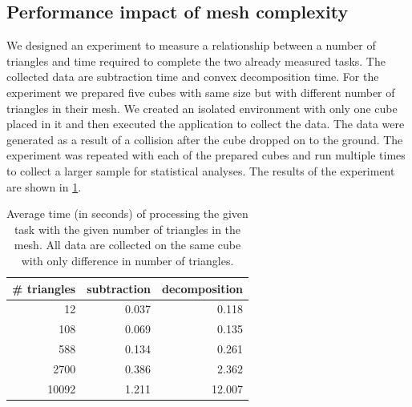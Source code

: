 \subsection{Performance impact of mesh complexity}
We designed an experiment to measure a relationship between a number of triangles and time required to complete the two already measured tasks. The collected data are subtraction time and convex decomposition time. For the experiment we prepared five cubes with same size but with different number of triangles in their mesh. We created an isolated environment with only one cube placed in it and then executed the application to collect the data. The data were generated as a result of a collision after the cube dropped on to the ground. The experiment was repeated with each of the prepared cubes and run multiple times to collect a larger sample for statistical analyses. The results of the experiment are shown in \cref{tab:subtraction-decomposition}. 
\begin{table}
\centering
\begin{tabular}{r r r}
\# triangles & subtraction & decomposition \\
\hline
12 & 0.037 & 0.118 \\
108 & 0.069 & 0.135 \\
588 & 0.134 & 0.261 \\ 
2700 & 0.386 & 2.362 \\ 
10092 & 1.211 & 12.007 \\
\end{tabular}
\caption{Average time (in seconds) of processing the given task with the given number of triangles in the mesh. All data are collected on the same cube with only difference in number of triangles.}
\label{tab:subtraction-decomposition}
\end{table}

